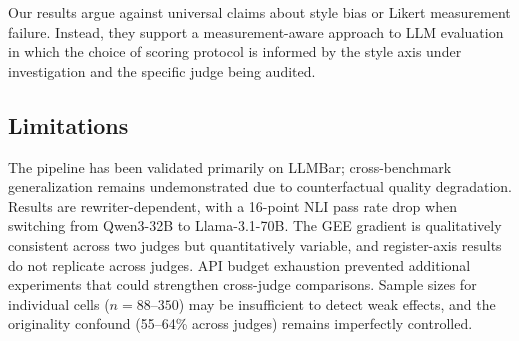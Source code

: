 \documentclass[11pt,a4paper]{article}
\begin{document}
Our results argue against universal claims about style bias or Likert measurement failure. Instead, they support a measurement-aware approach to LLM evaluation in which the choice of scoring protocol is informed by the style axis under investigation and the specific judge being audited.

\subsection*{Limitations}

The pipeline has been validated primarily on LLMBar; cross-benchmark generalization remains undemonstrated due to counterfactual quality degradation. Results are rewriter-dependent, with a 16-point NLI pass rate drop when switching from Qwen3-32B to Llama-3.1-70B. The GEE gradient is qualitatively consistent across two judges but quantitatively variable, and register-axis results do not replicate across judges. API budget exhaustion prevented additional experiments that could strengthen cross-judge comparisons. Sample sizes for individual cells ($n{=}88$--$350$) may be insufficient to detect weak effects, and the originality confound (55--64\% across judges) remains imperfectly controlled.


\end{document}
